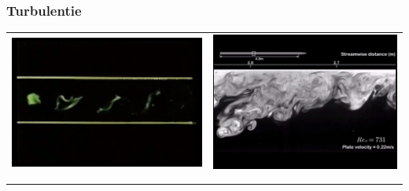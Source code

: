 \documentclass[t]{beamer}
\begin{document}
  	\begin{frame}
		\frametitle{Turbulentie}
		\center
		\begin{tabular}{cc}
			\href{run:fig/uitwendige_stroming/Turbulent_mixing.mp4}{
				\includegraphics[height=0.3\textheight]{fig/uitwendige_stroming/Turbulent_mixing.png}
			}
			&
			\href{run:fig/uitwendige_stroming/Turbulent_boundary_layer_eddies.mp4}{
				\includegraphics[height=0.3\textheight]{fig/uitwendige_stroming/Turbulent_boundary_layer_eddies.png}
			}
			\\
			&
			\\
			\href{run:fig/uitwendige_stroming/Turbulent_velocity_profile.mp4}{
}
\end{tabular}
\end{frame}
\end{document}
